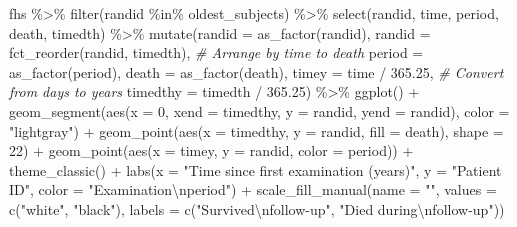 \documentclass[
]{book}
\newenvironment{Shaded}{\begin{snugshade}}{\end{snugshade}}
\newcommand{\AttributeTok}[1]{\textcolor[rgb]{0.77,0.63,0.00}{#1}}
\newcommand{\CommentTok}[1]{\textcolor[rgb]{0.56,0.35,0.01}{\textit{#1}}}
\newcommand{\DecValTok}[1]{\textcolor[rgb]{0.00,0.00,0.81}{#1}}
\newcommand{\FloatTok}[1]{\textcolor[rgb]{0.00,0.00,0.81}{#1}}
\newcommand{\FunctionTok}[1]{\textcolor[rgb]{0.00,0.00,0.00}{#1}}
\newcommand{\NormalTok}[1]{#1}
\newcommand{\SpecialCharTok}[1]{\textcolor[rgb]{0.00,0.00,0.00}{#1}}
\newcommand{\StringTok}[1]{\textcolor[rgb]{0.31,0.60,0.02}{#1}}
\begin{document}
\begin{Shaded}
\begin{Highlighting}[]
\NormalTok{fhs }\SpecialCharTok{\%\textgreater{}\%} 
  \FunctionTok{filter}\NormalTok{(randid }\SpecialCharTok{\%in\%}\NormalTok{ oldest\_subjects) }\SpecialCharTok{\%\textgreater{}\%} 
  \FunctionTok{select}\NormalTok{(randid, time, period, death, timedth) }\SpecialCharTok{\%\textgreater{}\%} 
  \FunctionTok{mutate}\NormalTok{(}\AttributeTok{randid =} \FunctionTok{as\_factor}\NormalTok{(randid), }
         \AttributeTok{randid =} \FunctionTok{fct\_reorder}\NormalTok{(randid, timedth),  }\CommentTok{\# Arrange by time to death}
         \AttributeTok{period =} \FunctionTok{as\_factor}\NormalTok{(period),}
         \AttributeTok{death =} \FunctionTok{as\_factor}\NormalTok{(death),}
         \AttributeTok{timey =}\NormalTok{ time }\SpecialCharTok{/} \FloatTok{365.25}\NormalTok{,                  }\CommentTok{\# Convert from days to years}
         \AttributeTok{timedthy =}\NormalTok{ timedth }\SpecialCharTok{/} \FloatTok{365.25}\NormalTok{) }\SpecialCharTok{\%\textgreater{}\%} 
  \FunctionTok{ggplot}\NormalTok{() }\SpecialCharTok{+} 
  \FunctionTok{geom\_segment}\NormalTok{(}\FunctionTok{aes}\NormalTok{(}\AttributeTok{x =} \DecValTok{0}\NormalTok{, }\AttributeTok{xend =}\NormalTok{ timedthy, }
                   \AttributeTok{y =}\NormalTok{ randid, }\AttributeTok{yend =}\NormalTok{ randid), }\AttributeTok{color =} \StringTok{"lightgray"}\NormalTok{) }\SpecialCharTok{+} 
  \FunctionTok{geom\_point}\NormalTok{(}\FunctionTok{aes}\NormalTok{(}\AttributeTok{x =}\NormalTok{ timedthy, }\AttributeTok{y =}\NormalTok{ randid, }\AttributeTok{fill =}\NormalTok{ death), }\AttributeTok{shape =} \DecValTok{22}\NormalTok{) }\SpecialCharTok{+} 
  \FunctionTok{geom\_point}\NormalTok{(}\FunctionTok{aes}\NormalTok{(}\AttributeTok{x =}\NormalTok{ timey, }\AttributeTok{y =}\NormalTok{ randid, }\AttributeTok{color =}\NormalTok{ period)) }\SpecialCharTok{+} 
  \FunctionTok{theme\_classic}\NormalTok{() }\SpecialCharTok{+} 
  \FunctionTok{labs}\NormalTok{(}\AttributeTok{x =} \StringTok{"Time since first examination (years)"}\NormalTok{, }
       \AttributeTok{y =} \StringTok{"Patient ID"}\NormalTok{, }
       \AttributeTok{color =} \StringTok{"Examination}\SpecialCharTok{\textbackslash{}n}\StringTok{period"}\NormalTok{) }\SpecialCharTok{+}
  \FunctionTok{scale\_fill\_manual}\NormalTok{(}\AttributeTok{name =} \StringTok{""}\NormalTok{, }\AttributeTok{values =} \FunctionTok{c}\NormalTok{(}\StringTok{"white"}\NormalTok{, }\StringTok{"black"}\NormalTok{), }
                    \AttributeTok{labels =} \FunctionTok{c}\NormalTok{(}\StringTok{"Survived}\SpecialCharTok{\textbackslash{}n}\StringTok{follow{-}up"}\NormalTok{, }\StringTok{"Died during}\SpecialCharTok{\textbackslash{}n}\StringTok{follow{-}up"}\NormalTok{))}
\end{Highlighting}
\end{Shaded}
\end{document}
